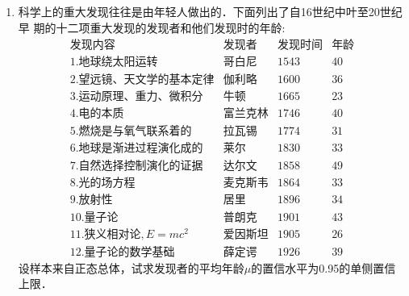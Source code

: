 \documentclass[10pt,a4paper]{article}
\begin{document}
\begin{enumerate}
    \item 科学上的重大发现往往是由年轻人做出的．下面列出了自16世纪中叶至20世纪早
    期的十二项重大发现的发现者和他们发现时的年龄:
    $$\begin{array}{llll}
        \mbox{发现内容} & \mbox{发现者} & \mbox{发现时间} & \mbox{年龄}\\
        \mbox{1.地球绕太阳运转} & \mbox{哥白尼} & 1543   &   40 \\  
        \mbox{2.望远镜、天文学的基本定律} & \mbox{伽利略} &  1600  & 36   \\  
        \mbox{3.运动原理、重力、微积分} & \mbox{牛顿} &  1665  &  23  \\  
        \mbox{4.电的本质} & \mbox{富兰克林} &   1746 &  40  \\  
        \mbox{5.燃烧是与氧气联系着的} & \mbox{拉瓦锡} & 1774   &  31  \\  
        \mbox{6.地球是渐进过程演化成的} & \mbox{莱尔} &  1830  &  33  \\  
        \mbox{7.自然选择控制演化的证据} & \mbox{达尔文} &  1858  & 49   \\  
        \mbox{8.光的场方程} & \mbox{麦克斯韦} &  1864  &  33  \\  
        \mbox{9.放射性} & \mbox{居里} &  1896  &  34  \\  
        \mbox{10.量子论} & \mbox{普朗克} & 1901   &  43  \\  
        \mbox{11.狭义相对论},E=mc^2 & \mbox{爱因斯坦} &  1905  &  26  \\  
        \mbox{12.量子论的数学基础} & \mbox{薛定谔} & 1926   &  39  
    \end{array}$$
    设样本来自正态总体，试求发现者的平均年龄$\mu$的置信水平为0.95的单侧置信上限．


    


  

\end{enumerate}
\end{document}

